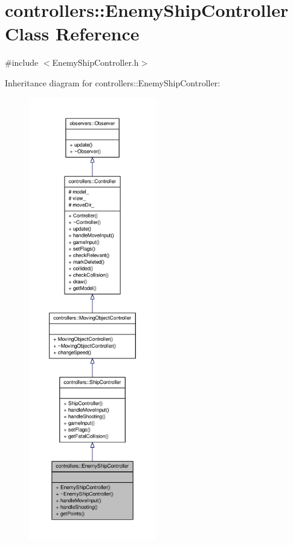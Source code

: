 \hypertarget{classcontrollers_1_1EnemyShipController}{\section{controllers\-:\-:\-Enemy\-Ship\-Controller \-Class \-Reference}
\label{df/dd1/classcontrollers_1_1EnemyShipController}
}


{\ttfamily \#include $<$\-Enemy\-Ship\-Controller.\-h$>$}



\-Inheritance diagram for controllers\-:\-:\-Enemy\-Ship\-Controller\-:\nopagebreak
\begin{figure}[H]
\begin{center}
\leavevmode
\includegraphics[height=550pt]{d7/ded/classcontrollers_1_1EnemyShipController__inherit__graph}
\end{center}
\end{figure}


